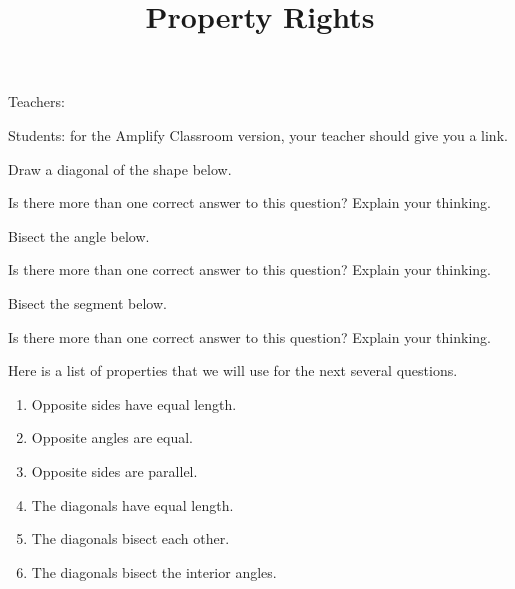 \documentclass[noauthor, nooutcomes]{ximera}
\title{Property Rights}
\begin{document}
\begin{abstract}\end{abstract}
\maketitle

Teachers: 

Students: for the Amplify Classroom version, your teacher should give you a link.


\begin{problem}
Draw a diagonal of the shape below. 
\begin{image}
\end{image}
Is there more than one correct answer to this question? Explain your thinking.
\end{problem}


\begin{problem}
Bisect the angle below. 
\begin{image}  \end{image}
Is there more than one correct answer to this question? Explain your thinking.
\end{problem}

\newpage
\begin{problem}
Bisect the segment below. 
\begin{center}  \end{center}
Is there more than one correct answer to this question? Explain your thinking.
\end{problem}

Here is a list of properties that we will use for the next several questions.
\begin{enumerate}[label=P{\arabic*}.]
    \item Opposite sides have equal length.
    \item Opposite angles are equal.
    \item Opposite sides are parallel. %
    \item The diagonals have equal length.
    \item The diagonals bisect each other.
    \item The diagonals bisect the interior angles.
\end{enumerate} 
\end{document}
